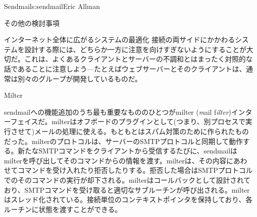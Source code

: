 \begin{aosachapter}{Sendmail}{s:sendmail}{Eric Allman}
\begin{aosasect1}{その他の検討事項}
\begin{aosasect2}{インターネット全体に広がるシステムの最適化}
接続の両サイドにかかわるシステムを設計する際には、どちらか一方に注意を向けすぎないようにすることが大切だ。これは、よくあるクライアントとサーバーの不調和とはまったく対照的な話であることに注意しよう---たとえばウェブサーバーとそのクライアントは、通常は別々のグループが開発しているものだ。

\end{aosasect2}

\begin{aosasect2}{Milter}

sendmailへの機能追加のうち最も重要なもののひとつがmilter (\emph{m}ail f\emph{ilter})インターフェイスだ。milterはオフボードのプラグインとして(つまり、別プロセスで実行させて)メールの処理に使える。もともとはスパム対策のために作られたものだった。milterのプロトコルは、サーバーのSMTPプロトコルと同期して動作する。新たなSMTPコマンドをクライアントから受信するたびに、sendmailはmilterを呼び出してそのコマンドからの情報を渡す。milterは、その内容にあわせてコマンドを受け入れたり拒否したりする。拒否した場合はSMTPプロトコルでのそのコマンドの実行が却下される。milterはコールバックとして設計されており、SMTPコマンドを受け取ると適切なサブルーチンが呼び出される。milterはスレッド化されている。接続単位のコンテキストポインタを保持しており、各ルーチンに状態を渡すことができる。


\end{aosasect2}
\end{aosasect1}
\end{aosachapter}
